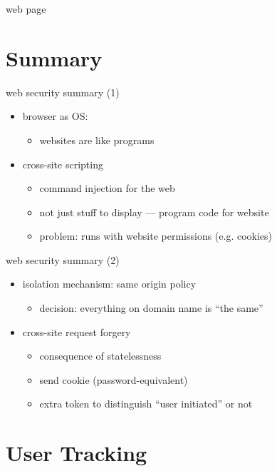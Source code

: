 \begin{frame}{web page}
\end{frame}

\section{Summary}

\begin{frame}{web security summary (1)}
    \begin{itemize}
    \item browser as OS:
        \begin{itemize}
        \item websites are like programs
        \end{itemize}
    \item cross-site scripting
        \begin{itemize}
        \item command injection for the web
        \item not just stuff to display --- program code for website
        \item problem: runs with website permissions (e.g. cookies)
        \end{itemize}
    \end{itemize}
\end{frame}

\begin{frame}{web security summary (2)}
    \begin{itemize}
    \item isolation mechanism: same origin policy
        \begin{itemize}
        \item decision: everything on domain name is ``the same''
        \end{itemize}
    \item cross-site request forgery
        \begin{itemize}
        \item consequence of statelessness
        \item {} send cookie (password-equivalent)
        \item extra token to distinguish ``user initiated'' or not
        \end{itemize}
    \end{itemize}
\end{frame}

\section{User Tracking}

